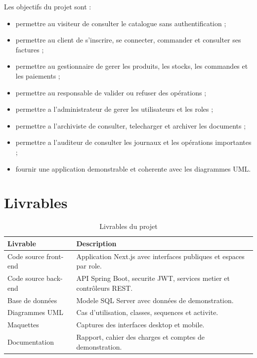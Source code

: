 \documentclass[12pt,a4paper]{report}
\begin{document}
Les objectifs du projet sont :

\begin{itemize}
  \item permettre au visiteur de consulter le catalogue sans authentification ;
  \item permettre au client de s'inscrire, se connecter, commander et consulter ses factures ;
  \item permettre au gestionnaire de gerer les produits, les stocks, les commandes et les paiements ;
  \item permettre au responsable de valider ou refuser des opérations ;
  \item permettre a l'administrateur de gerer les utilisateurs et les roles ;
  \item permettre a l'archiviste de consulter, telecharger et archiver les documents ;
  \item permettre a l'auditeur de consulter les journaux et les opérations importantes ;
  \item fournir une application demonstrable et coherente avec les diagrammes UML.
\end{itemize}

\section{Livrables}

\begin{table}[H]
\centering
\caption{Livrables du projet}
\begin{tabular}{|p{5cm}|p{9cm}|}
\hline
\textbf{Livrable} & \textbf{Description} \\
\hline
Code source front-end & Application Next.js avec interfaces publiques et espaces par role. \\
\hline
Code source back-end & API Spring Boot, securite JWT, services metier et contrôleurs REST. \\
\hline
Base de données & Modele SQL Server avec données de demonstration. \\
\hline
Diagrammes UML & Cas d'utilisation, classes, sequences et activite. \\
\hline
Maquettes & Captures des interfaces desktop et mobile. \\
\hline
Documentation & Rapport, cahier des charges et comptes de demonstration. \\
\hline
\end{tabular}
\end{table}
\end{document}
